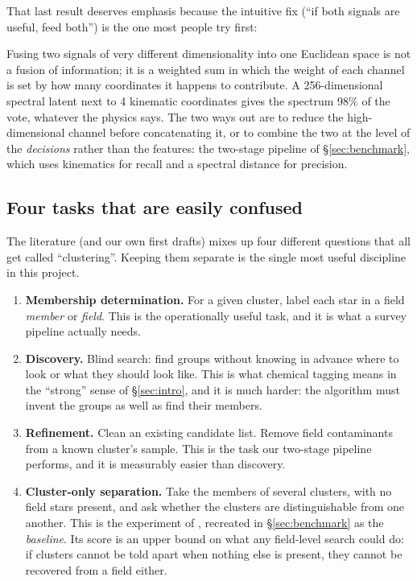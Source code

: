 That last result deserves emphasis because the intuitive fix (``if both signals
are useful, feed both'') is the one most people try first:

\begin{issues} Fusing two signals of very different
dimensionality into one Euclidean space is not a fusion of information; it is a
weighted sum in which the weight of each channel is set by how many coordinates
it happens to contribute. A 256-dimensional spectral latent next to 4 kinematic
coordinates gives the spectrum 98\% of the vote, whatever the physics says. The
two ways out are to reduce the high-dimensional channel before concatenating
it, or to combine the two at the level of the \emph{decisions} rather than the
features: the two-stage pipeline of \S\ref{sec:benchmark}, which uses
kinematics for recall and a spectral distance for precision.
\end{issues}

\subsection{Four tasks that are easily confused}

The literature (and our own first drafts) mixes up four different questions
that all get called ``clustering''. Keeping them separate is the single most
useful discipline in this project.

\begin{enumerate}
\item \textbf{Membership determination.} For a given cluster, label each star
  in a field \emph{member} or \emph{field}. This is the operationally useful
  task, and it is what a survey pipeline actually needs.
\item \textbf{Discovery.} Blind search: find groups without knowing in advance
  where to look or what they should look like. This is what chemical tagging
  means in the ``strong'' sense of \S\ref{sec:intro}, and it is much harder:
  the algorithm must invent the groups as well as find their members.
\item \textbf{Refinement.} Clean an existing candidate list. Remove field
contaminants from a known cluster's sample. This is the task our two-stage
pipeline performs, and it is measurably easier than discovery.
\item \textbf{Cluster-only separation.} Take the members of several clusters,
  with no field stars present, and ask whether the clusters are
  distinguishable from one another. This is the experiment of
  \citet{GarciaDias:19}, recreated in \S\ref{sec:benchmark} as the
  \emph{baseline}. Its score is an upper bound on what any field-level search
  could do: if clusters cannot be told apart when nothing else is present,
  they cannot be recovered from a field either.
\end{enumerate}

